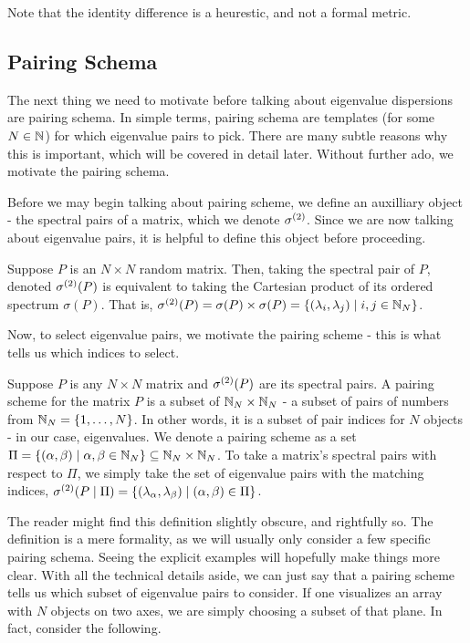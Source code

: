 \noindent *Note that the identity difference is a heurestic, and not a formal metric.

\newpage
\subsection{Pairing Schema}

The next thing we need to motivate before talking about eigenvalue dispersions are pairing schema. In simple terms, pairing schema are templates (for some $N \in \mathbb{N}$) for which eigenvalue pairs to pick. There are many subtle reasons why this is important, which will be covered in detail later. Without further ado, we motivate the pairing schema.

Before we may begin talking about pairing scheme, we define an auxilliary object - the spectral pairs of a matrix, which we denote ${\sigma^{(2)}}$. Since we are now talking about eigenvalue pairs, it is helpful to define this object before proceeding.

\begin{definition}
Suppose $P$ is an $N \times N$ random matrix. Then, taking the spectral pair of $P$, denoted ${\sigma^{(2)}}(P)$ is equivalent to taking the Cartesian product of its ordered spectrum $\sigma(P)$. That is, ${\sigma^{(2)}}(P) = \sigma(P) \times \sigma(P) = \{(\lambda_i, \lambda_j) \mid i,j \in \mathbb{N}_N\}$.
\end{definition}

Now, to select eigenvalue pairs, we motivate the pairing scheme - this is what tells us which indices to select.

\begin{definition}
Suppose $P$ is any $N \times N$ matrix and ${\sigma^{(2)}}(P)$ are its spectral pairs. A pairing scheme for the matrix $P$ is a subset of $\mathbb{N}_N \times \mathbb{N}_N$ - a subset of pairs of numbers from $\mathbb{N}_N = \{1, \dots, N\}$. In other words, it is a subset of pair indices for $N$ objects - in our case, eigenvalues. We denote a pairing scheme as a set $\Pi = \{(\alpha, \beta) \mid \alpha, \beta \in \mathbb{N}_N\} \subseteq \mathbb{N}_N \times \mathbb{N}_N$. To take a matrix's spectral pairs with respect to $\Pi$, we simply take the set of eigenvalue pairs with the matching indices, ${\sigma^{(2)}}(P \mid \Pi) = \{(\lambda_{\alpha},\lambda_{\beta}) \mid ({\alpha},{\beta}) \in \Pi\}$.
\end{definition}

The reader might find this definition slightly obscure, and rightfully so. The definition is a mere formality, as we will usually only consider a few specific pairing schema. Seeing the explicit examples will hopefully make things more clear. With all the technical details aside, we can just say that a pairing scheme tells us which subset of eigenvalue pairs to consider. If one visualizes an array with $N$ objects on two axes, we are simply choosing a subset of that plane. In fact, consider the following.

